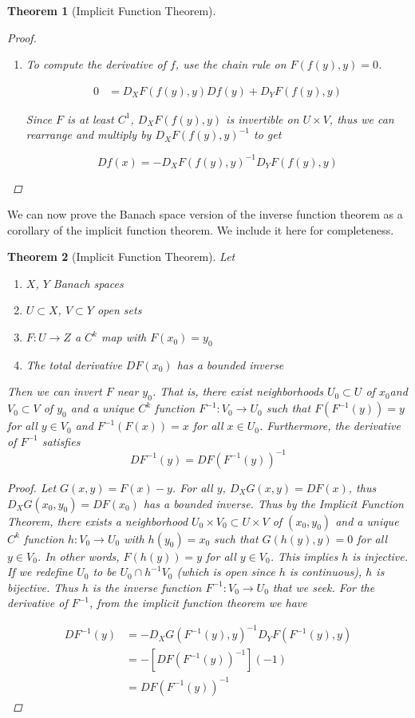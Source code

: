 \documentclass{article}
\newtheorem{theorem}{Theorem}[section]
\begin{document}
\begin{theorem}[Implicit Function Theorem]
\begin{proof}
\begin{enumerate}
\item To compute the derivative of $f$, use the chain rule on $F(f(y), y) = 0$.

\begin{align*}
0 &= D_X F(f(y),y)Df(y) + D_Y F(f(y),y)
\end{align*}

Since $F$ is at least $C^1$, $D_X F(f(y),y)$ is invertible on $U \times V$, thus we can rearrange and multiply by $D_X F(f(y),y)^{-1}$ to get

\[
Df(x) = -D_X F(f(y),y)^{-1} D_Y F(f(y),y)
\]

\end{enumerate}
\end{proof}
\end{theorem}

We can now prove the Banach space version of the inverse function theorem as a corollary of the implicit function theorem. We include it here for completeness.

\begin{theorem}[Implicit Function Theorem]
Let
\begin{enumerate}
\item $X$, $Y$ Banach spaces
\item $U \subset X$, $V \subset Y$ open sets
\item $F: U \rightarrow Z$ a $C^k$ map with $F(x_0) = y_0$
\item The total derivative $D F(x_0)$ has a bounded inverse
\end{enumerate}
Then we can invert $F$ near $y_0$. That is, there exist neighborhoods $U_0 \subset U$ of $x_0$and $V_0 \subset V$ of $y_0$ and a unique $C^k$ function $F^{-1}: V_0 \rightarrow U_0$ such that $F(F^{-1}(y)) = y$ for all $y \in V_0$ and $F^{-1}(F(x)) = x$ for all $x \in U_0$. Furthermore, the derivative of $F^{-1}$ satisfies
\[
DF^{-1}(y) = D F( F^{-1}(y) )^{-1}
\]

\begin{proof}
Let $G(x,y) = F(x) - y$. For all $y$, $D_X G(x,y) = D F(x)$, thus $D_X G(x_0, y_0) = D F(x_0)$ has a bounded inverse. Thus by the Implicit Function Theorem, there exists a neighborhood $U_0 \times V_0 \subset U \times V$ of $(x_0, y_0)$ and a unique $C^k$ function $h: V_0 \rightarrow U_0$ with $h(y_0) = x_0$ such that $G(h(y), y) = 0$ for all $y \in V_0$. In other words, $F(h(y)) = y$ for all $y \in V_0$. This implies $h$ is injective. If we redefine $U_0$ to be $U_0 \cap h^{-1} V_0$ (which is open since $h$ is continuous), $h$ is bijective. Thus $h$ is the inverse function $F^{-1}: V_0 \rightarrow U_0$ that we seek. For the derivative of $F^{-1}$, from the implicit function theorem we have


\begin{align*}
DF^{-1}(y) &= -D_X G(F^{-1}(y),y)^{-1} D_Y F(F^{-1}(y),y) \\
&= -[D F( F^{-1}(y) )^{-1}] (-1) \\
&= D F( F^{-1}(y) )^{-1}
\end{align*}

\end{proof}
\end{theorem}
\end{document}
